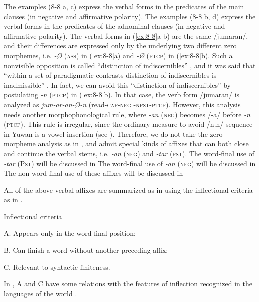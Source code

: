 The examples (8-8 a, c) express the verbal forms in the predicates of the main clauses (in negative and affirmative polarity). The examples (8-8 b, d) express the verbal forms in the predicates of the adnominal clauses (in negative and affirmative polarity). The verbal forms in (\ref{ex:8-8}a-b) are the same /jumaran/, and their differences are expressed only by the underlying two different zero morphemes, i.e. \textit{-Ø} (\textsc{ass}) in (\ref{ex:8-8}a) and \textit{-Ø} (\textsc{ptcp}) in (\ref{ex:8-8}b). Such a nonvisible opposition is called “distinction of indiscernibles” \citep[36]{Haas1974}, and it was said that “within a set of paradigmatic contrasts distinction of indiscernibles is inadmissible” \citep[83]{McGregor2003}. In fact, we can avoid this “distinction of indiscernibles” by postulating \textit{-n} (\textsc{ptcp}) in (\ref{ex:8-8}b). In that case, the verb form /jumaran/ is analyzed as \textit{jum-ar-an-Ø-n} (read-\textsc{cap}-\textsc{neg} -\textsc{npst}-\textsc{ptcp}). However, this analysis needs another morphophonological rule, where \textit{-an} (\textsc{neg}) becomes /-a/ before \textit{-n} (\textsc{ptcp}). This rule is irregular, since the ordinary measure to avoid /n.n/ sequence in Yuwan is a vowel insertion (see ). Therefore, we do not take the zero-morpheme analysis as in , and admit special kinds of affixes that can both close and continue the verbal stems, i.e. \textit{-an} (\textsc{neg}) and \textit{-tar} (\textsc{pst}). The word-final use of \textit{-tar} (P\textsc{st}) will be discussed in  The word-final use of \textit{-an} (\textsc{neg}) will be discussed in  The non-word-final use of these affixes will be discussed in 

  All of the above verbal affixes are summarized as in  using the inflectional criteria as in .

\ea\label{ex:8-9}
  Inflectional criteria

  A.  Appears only in the word-final position;

  B.  Can finish a word without another preceding affix;

  C.  Relevant to syntactic finiteness.
\z

In , A and C have some relations with the features of inflection recognized in the languages of the world \citep[90]{Haspelmath2010}.


